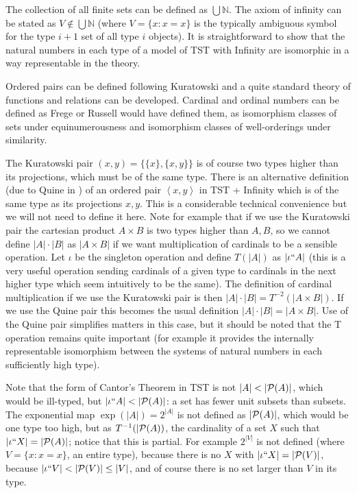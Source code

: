 \documentclass[112pt]{article}
\begin{document}
The collection of all finite sets can be defined as $\bigcup \mathbb N$.  The axiom of infinity can be stated as $V \not\in \bigcup \mathbb N$ (where $V= \{x:x=x\}$ is the typically ambiguous symbol for the type $i+1$ set of all type $i$ objects).  It is straightforward to show that the natural numbers in each type of a model of TST with Infinity are isomorphic in a way representable in the theory.

Ordered pairs can be defined following Kuratowski and a quite standard theory of functions and relations can be developed.  Cardinal and ordinal numbers can be defined as Frege or Russell would have defined them, as isomorphism classes of sets under equinumerousness and isomorphism classes of well-orderings under similarity.  

The Kuratowski pair $(x,y) = \{\{x\},\{x,y\}\}$ is of course two types higher than its projections, which must be of the same type.  There is an alternative definition (due to Quine in \cite{quinepair}) of an ordered pair
$\left< x,y\right>$ in TST + Infinity which is of the same type as its projections $x,y$.  This is a considerable technical convenience but we will not need to define it here.  Note for example that if we use the Kuratowski pair the cartesian product $A \times B$ is two types higher than $A,B$, so we cannot define $|A| \cdot |B|$ as $|A \times B|$ if we want multiplication of cardinals to be a sensible operation.  Let $\iota$ be the singleton operation and define $T(|A|)$ as $|\iota``A|$ (this is a very useful operation sending cardinals of a given type to cardinals in the next higher type which seem intuitively to be the same).  The definition of cardinal multiplication if we use the Kuratowski pair is then $|A| \cdot |B| =T^{-2}(|A\times B|)$.  If we use the Quine pair this becomes the usual definition $|A| \cdot |B| =|A\times B|$.  Use of the Quine pair simplifies matters in this case, but it should be noted that the T operation remains quite important (for example it provides the internally representable isomorphism between the systems of natural numbers in each sufficiently high type).

Note that the form of Cantor's Theorem in TST is not $|A| < |{\cal P}(A)|$, which would be ill-typed, but $|\iota``A|<|{\cal P}(A)|$:  a set has fewer unit subsets than subsets.  The exponential map $\exp(|A|) = 2^{|A|}$ is not defined as $|{\cal P}(A)|$, which would be one type too high, but as $T^{-1}(|{\cal P}(A))$, the cardinality of a set $X$ such that $|\iota``X| = |{\cal P}(A)|$;   notice that this is partial.  For example
$2^{|V|}$ is not defined (where $V=\{x:x=x\}$, an entire type), because there is no $X$ with $|\iota``X|=|{\cal P}(V)|$, because $|\iota``V|<|{\cal P}(V)| \leq |V|$, and of course there is no set larger than $V$ in its type.
\end{document}
